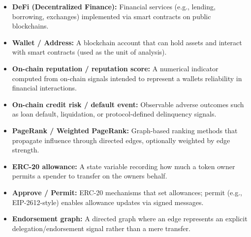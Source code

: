 \documentclass[
]{article}
\begin{document}
\begin{itemize}
\item
  \textbf{DeFi (Decentralized Finance):} Financial services (e.g., lending, borrowing, exchanges) implemented via smart contracts on public blockchains.
\item
  \textbf{Wallet / Address:} A blockchain account that can hold assets and interact with smart contracts (used as the unit of analysis).
\item
  \textbf{On-chain reputation / reputation score:} A numerical indicator computed from on-chain signals intended to represent a wallet\textquotesingle s reliability in financial interactions.
\item
  \textbf{On-chain credit risk / default event:} Observable adverse outcomes such as loan default, liquidation, or protocol-defined delinquency signals.
\item
  \textbf{PageRank / Weighted PageRank:} Graph-based ranking methods that propagate influence through directed edges, optionally weighted by edge strength.
\item
  \textbf{ERC-20 allowance:} A state variable recording how much a token owner permits a spender to transfer on the owner\textquotesingle s behalf.
\item
  \textbf{Approve / Permit:} ERC-20 mechanisms that set allowances; permit (e.g., EIP-2612-style) enables allowance updates via signed messages.
\item
  \textbf{Endorsement graph:} A directed graph where an edge represents an explicit delegation/endorsement signal rather than a mere transfer.
\end{itemize}
\end{document}
